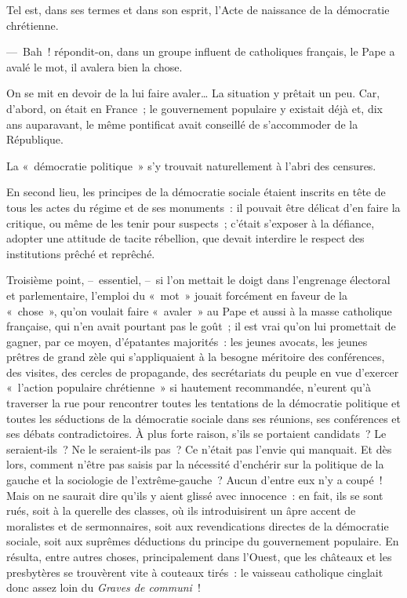 \documentclass[french,twoside]{book} %
\begin{document}
Tel est, dans ses termes et dans son esprit, l’Acte de naissance de la démocratie chrétienne.\par
— Bah ! répondit-on, dans un groupe influent de catholiques français, le Pape a avalé le mot, il avalera bien la chose.\par
On se mit en devoir de la lui faire avaler… La situation y prêtait un peu. Car, d’abord, on était en France ; le gouvernement populaire y existait déjà et, dix ans auparavant, le même pontificat avait conseillé de s’accommoder de la République.\par
La « démocratie politique » s’y trouvait naturellement à l’abri des censures.\par
En second lieu, les principes de la démocratie sociale étaient inscrits en tête de tous les actes du régime et de ses monuments : il pouvait être délicat d’en faire la critique, ou même de les tenir pour suspects ; c’était s’exposer à la défiance, adopter une attitude de tacite rébellion, que devait interdire le respect des institutions prêché et reprêché.\par
Troisième point, – essentiel, – si l’on mettait le doigt dans l’engrenage électoral et parlementaire, l’emploi du « mot » jouait forcément en faveur de la « chose », qu’on voulait faire « avaler » au Pape et aussi à la masse catholique française, qui n’en avait pourtant pas le goût ; il est vrai qu’on lui promettait de gagner, par ce moyen, d’épatantes majorités : les jeunes avocats, les jeunes prêtres de grand zèle qui s’appliquaient à la besogne méritoire des conférences, des visites, des cercles de propagande, des secrétariats du peuple en vue d’exercer « l’action populaire chrétienne » si hautement recommandée, n’eurent qu’à traverser la rue pour rencontrer toutes les tentations de la démocratie politique et toutes les séductions de la démocratie sociale dans ses réunions, ses conférences et ses débats contradictoires. À plus forte raison, s’ils se portaient candidats ? Le seraient-ils ? Ne le seraient-ils pas ? Ce n’était pas l’envie qui manquait. Et dès lors, comment n’être pas saisis par la nécessité d’enchérir sur la politique de la gauche et la sociologie de l’extrême-gauche ? Aucun d’entre eux n’y a coupé ! Mais on ne saurait dire qu’ils y aient glissé avec innocence : en fait, ils se sont rués, soit à la querelle des classes, où ils introduisirent un âpre accent de moralistes et de sermonnaires, soit aux revendications directes de la démocratie sociale, soit aux suprêmes déductions du principe du gouvernement populaire. En résulta, entre autres choses, principalement dans l’Ouest, que les châteaux et les presbytères se trouvèrent vite à couteaux tirés : le vaisseau catholique cinglait donc assez loin du \emph{Graves de communi} !\par
\end{document}
